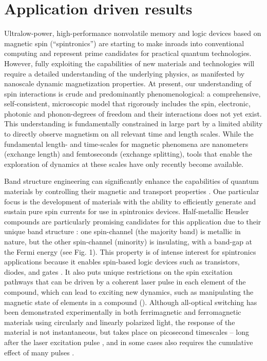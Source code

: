 \section{Application driven results}

Ultralow-power, high-performance nonvolatile memory and logic devices based on magnetic spin (“spintronics”) are starting to make inroads into conventional computing and represent prime candidates for practical quantum technologies. However, fully exploiting the capabilities of new materials and technologies will require a detailed understanding of the underlying physics, as manifested by nanoscale dynamic magnetization properties. At present, our understanding of spin interactions is crude and predominantly phenomenological: a comprehensive, self-consistent, microscopic model that rigorously includes the spin, electronic, photonic and phonon-degrees of freedom and their interactions does not yet exist. This understanding is fundamentally constrained in large part by a limited ability to directly observe magnetism on all relevant time and length scales. While the fundamental length- and time-scales for magnetic phenomena are nanometers (exchange length) and femtoseconds (exchange splitting), tools that enable the exploration of dynamics at these scales have only recently become available. 

Band structure engineering can significantly enhance the capabilities of quantum materials by controlling their magnetic and transport properties \cite{He2017,Klaer2009}. One particular focus is the development of materials with the ability to efficiently generate and sustain pure spin currents for use in spintronics devices. Half-metallic Heusler compounds are particularly promising candidates for this application due to their unique band structure \cite{Muller2009, Mann2012}: one spin-channel (the majority band) is metallic in nature, but the other spin-channel (minority) is insulating, with a band-gap at the Fermi energy (see Fig. 1). This property is of intense interest for spintronics applications because it enables spin-based logic devices such as transistors, diodes, and gates \cite{Prinz1995}. It also puts unique restrictions on the spin excitation pathways that can be driven by a coherent laser pulse in each element of the compound, which can lead to exciting new dynamics, such as manipulating the magnetic state of elements in a compound (\cite{Elliott2016,Steil2010}). Although all-optical switching has been demonstrated experimentally in both ferrimagnetic and ferromagnetic materials using circularly and linearly polarized light, the response of the material is not instantaneous, but takes place on picosecond timescales – long after the laser excitation pulse \cite{Kuiper2014}, and in some cases also requires the cumulative effect of many pulses \cite{Lambert2014,Mangin2014}.

